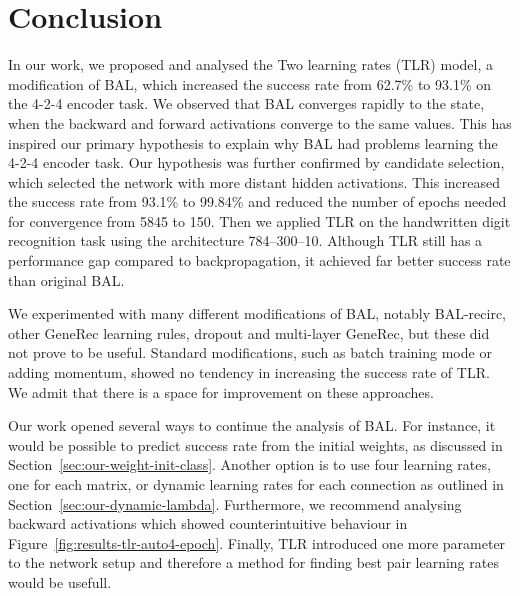 
\section*{Conclusion}
\label{sec:conclusion} 

In our work, we proposed and analysed the Two learning rates (TLR) model, a modification of BAL, which increased the success rate from 62.7\% to 93.1\% on the 4-2-4 encoder task. We observed that BAL converges rapidly to the state, when the backward and forward activations converge to the same values. This has inspired our primary hypothesis to explain why BAL had problems learning the 4-2-4 encoder task. Our hypothesis was further confirmed by candidate selection, which selected the network with more distant hidden activations. This increased the success rate from 93.1\% to 99.84\% and reduced the number of epochs needed for convergence from 5845 to 150. Then we applied TLR on the handwritten digit recognition task using the architecture 784--300--10. Although TLR still has a performance gap compared to backpropagation, it achieved far better success rate than original BAL.

We experimented with many different modifications of BAL, notably BAL-recirc, other GeneRec learning rules, dropout and multi-layer GeneRec, but these did not prove to be useful. Standard modifications, such as batch training mode or adding momentum, showed no tendency in increasing the success rate of TLR. We admit that there is a space for improvement on these approaches.

\label{sec:future-work}
Our work opened several ways to continue the analysis of BAL. For instance, it would be possible to predict success rate from the initial weights, as discussed in Section~\ref{sec:our-weight-init-class}. Another option is to use four learning rates, one for each matrix, or dynamic learning rates for each connection as outlined in Section~\ref{sec:our-dynamic-lambda}. Furthermore, we recommend analysing backward activations which showed counterintuitive behaviour in Figure~\ref{fig:results-tlr-auto4-epoch}. Finally, TLR introduced one more parameter to the network setup and therefore a method for finding best pair learning rates would be usefull. 


